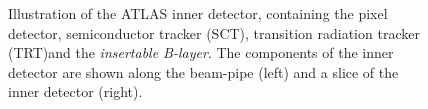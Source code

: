 \begin{figure}[!htpb]
\begin{subfigure}[b]{0.49\textwidth}
        \label{fig:limit_lambda2}
    \end{subfigure}
    \caption[Illustration of the ATLAS inner detector]{Illustration of the ATLAS inner detector, containing the pixel detector, semiconductor tracker (SCT), transition radiation tracker (TRT)and the \emph{insertable B-layer}. The components of the inner detector are shown along the beam-pipe (left) and a slice of the inner detector (right).}
    \label{fig:method:ATLAS:ID}
\end{figure}

